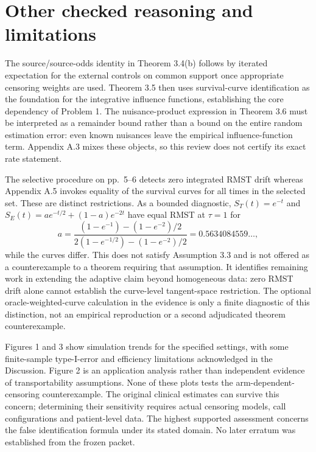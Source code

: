 \documentclass[10pt]{article}
\begin{document}
\section*{Other checked reasoning and limitations}
The source/source-odds identity in Theorem 3.4(b) follows by iterated expectation for the external controls on common support once appropriate censoring weights are used. Theorem 3.5 then uses survival-curve identification as the foundation for the integrative influence functions, establishing the core dependency of Problem 1. The nuisance-product expression in Theorem 3.6 must be interpreted as a remainder bound rather than a bound on the entire random estimation error: even known nuisances leave the empirical influence-function term. Appendix A.3 mixes these objects, so this review does not certify its exact rate statement.\par
The selective procedure on pp. 5–6 detects zero integrated RMST drift whereas Appendix A.5 invokes equality of the survival curves for all times in the selected set. These are distinct restrictions. As a bounded diagnostic, \(S_T(t)=e^{-t}\) and \(S_E(t)=a e^{-t/2}+(1-a)e^{-2t}\) have equal RMST at \(\tau=1\) for \[a=\frac{(1-e^{-1})-(1-e^{-2})/2}{2(1-e^{-1/2})-(1-e^{-2})/2}=0.5634084559\ldots,\] while the curves differ. This does not satisfy Assumption 3.3 and is not offered as a counterexample to a theorem requiring that assumption. It identifies remaining work in extending the adaptive claim beyond homogeneous data: zero RMST drift alone cannot establish the curve-level tangent-space restriction. The optional oracle-weighted-curve calculation in the evidence is only a finite diagnostic of this distinction, not an empirical reproduction or a second adjudicated theorem counterexample.\par
Figures 1 and 3 show simulation trends for the specified settings, with some finite-sample type-I-error and efficiency limitations acknowledged in the Discussion. Figure 2 is an application analysis rather than independent evidence of transportability assumptions. None of these plots tests the arm-dependent-censoring counterexample. The original clinical estimates can survive this concern; determining their sensitivity requires actual censoring models, call configurations and patient-level data. The highest supported assessment concerns the false identification formula under its stated domain. No later erratum was established from the frozen packet.\par
\end{document}
